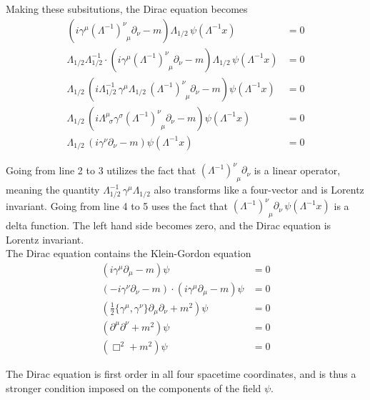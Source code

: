 \noindent Making these subsitutions, the Dirac equation becomes
\begin{align}
\left( i\gamma^\mu (\Lambda^{-1})^\nu_{\,\,\,\mu}\partial_\nu - m \right) \Lambda_{1/2}\, \psi(\Lambda^{-1}x) &= 0 \\
\Lambda_{1/2} \Lambda^{-1}_{1/2}\cdot \left( i\gamma^\mu (\Lambda^{-1})^\nu_{\,\,\,\mu}\partial_\nu - m \right) \Lambda_{1/2}\, \psi(\Lambda^{-1}x) &= 0 \\
\Lambda_{1/2}\, \left( i\Lambda^{-1}_{1/2}\,\gamma^\mu \Lambda_{1/2} \,(\Lambda^{-1})^\nu_{\,\,\,\mu}\partial_\nu - m \right) \psi(\Lambda^{-1}x) &= 0 \\
\Lambda_{1/2}\, \left( i\Lambda^\mu_{\,\,\,\sigma} \gamma^\sigma (\Lambda^{-1})^\nu_{\,\,\,\mu}\partial_\nu - m \right) \psi(\Lambda^{-1}x) &= 0 \\
\Lambda_{1/2}\, \left( i\gamma^\nu \partial_\nu - m \right) \psi(\Lambda^{-1}x) &= 0 
\end{align}

\noindent Going from line 2 to 3 utilizes the fact that $(\Lambda^{-1})^\nu_{\,\,\,\mu}\partial_\nu$ is a linear operator, meaning the quantity $\Lambda^{-1}_{1/2}\,\gamma^\mu \Lambda_{1/2}$ also transforms like a four-vector and is Lorentz invariant. Going from line 4 to 5 uses the fact that $(\Lambda^{-1})^\nu_{\,\,\,\mu}\partial_\nu \, \psi(\Lambda^{-1} x)$ is a delta function. The left hand side becomes zero, and the Dirac equation is Lorentz invariant. \\

\noindent The Dirac equation contains the Klein-Gordon equation
\begin{align*}
(i\gamma^\mu \partial_\mu - m) \psi &= 0 \\
(-i\gamma^\nu \partial_\nu - m) \cdot (i\gamma^\mu \partial_\mu - m) \psi &= 0 \\
(\frac{1}{2} \{ \gamma^\mu, \gamma^\nu \} \partial_\mu \partial_\nu + m^2)\psi &= 0 \\
(\partial^\mu \partial^\nu + m^2) \psi &= 0 \\
(\Box^2 + m^2) \psi &= 0
\end{align*}

\noindent The Dirac equation is first order in all four spacetime coordinates, and is thus a stronger condition imposed on the components of the field $\psi$.